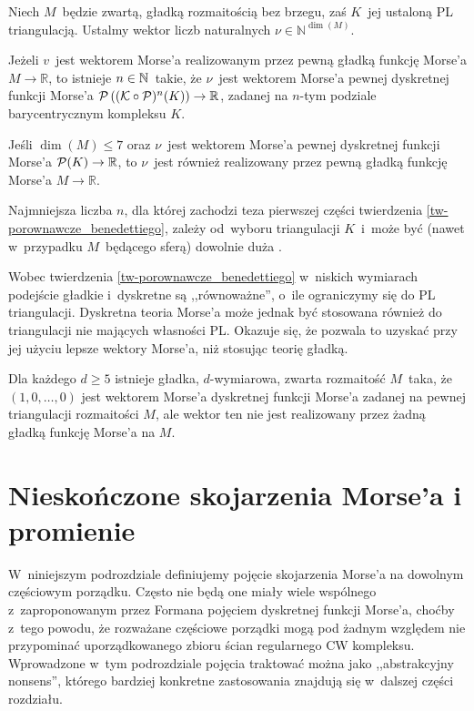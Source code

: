 \begin{tw}\label{tw-porownawcze_benedettiego}
Niech $M$~będzie zwartą, gładką rozmaitością bez brzegu, zaś $K$~jej ustaloną PL triangulacją. Ustalmy wektor liczb naturalnych $\nu\in\mathbb{N}^{\dim(M)}$.

Jeżeli $v$~jest wektorem Morse'a realizowanym przez pewną gładką funkcję Morse'a $M\to \mathbb{R}$, to istnieje $n\in\mathbb{N}$~takie, że $\nu$~jest wektorem Morse'a pewnej dyskretnej funkcji Morse'a $\mathcal{P}\left((\mathcal{K}\circ \mathcal{P})^n(K)\right)\to \mathbb{R}$, zadanej na $n$-tym podziale barycentrycznym kompleksu $K$.

Jeśli $\dim(M)\leq 7$ oraz $\nu$~jest wektorem Morse'a pewnej dyskretnej funkcji Morse'a $\mathcal{P}(K)\to\mathbb{R}$, to $\nu$~jest również realizowany przez pewną gładką funkcję Morse'a $M\to \mathbb{R}$.
\end{tw}

Najmniejsza liczba $n$, dla której zachodzi teza pierwszej części twierdzenia \ref{tw-porownawcze_benedettiego}, zależy od~wyboru triangulacji $K$~i~może być (nawet w~przypadku $M$~będącego sferą) dowolnie duża \cite[Proposition 3.20]{Benedetti13}.

Wobec twierdzenia \ref{tw-porownawcze_benedettiego} w~niskich wymiarach podejście gładkie i~dyskretne są ,,równoważne'', o~ile ograniczymy się do PL triangulacji. Dyskretna teoria Morse'a może jednak być stosowana również do triangulacji nie mających własności PL. Okazuje się, że pozwala to uzyskać przy jej użyciu lepsze wektory Morse'a, niż stosując teorię gładką.

\begin{tw}
Dla każdego $d\geq 5$ istnieje gładka, \mbox{$d$-wymiarowa}, zwarta rozmaitość $M$~taka, że $(1,0,\ldots,0)$ jest wektorem Morse'a dyskretnej funkcji Morse'a zadanej na pewnej triangulacji rozmaitości $M$, ale wektor ten nie jest realizowany przez żadną gładką funkcję Morse'a na $M$.
\end{tw}



\section{Nieskończone skojarzenia Morse'a i promienie}\label{rayless}
W~niniejszym podrozdziale definiujemy pojęcie skojarzenia Morse'a na dowolnym częściowym porządku. Często nie będą one miały wiele wspólnego z~zaproponowanym przez Formana pojęciem dyskretnej funkcji Morse'a, choćby z~tego powodu, że rozważane częściowe porządki mogą pod żadnym względem nie przypominać uporządkowanego zbioru ścian regularnego CW kompleksu. Wprowadzone w~tym podrozdziale pojęcia traktować można jako ,,abstrakcyjny nonsens'', którego bardziej konkretne zastosowania znajdują się w~dalszej części rozdziału.

